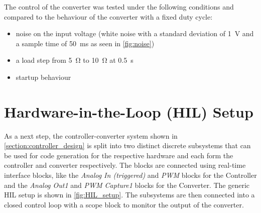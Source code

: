 The control of the converter was tested under the following conditions and compared to the behaviour of the converter with a fixed duty cycle:
\begin{itemize}
    \item noise on the input voltage (white noise with a standard deviation of \qty{1}{\volt} and a sample time of \qty{50}{\milli\second} as seen in \autoref{fig:noise})
    \item a load step from \qty{5}{\ohm} to \qty{10}{\ohm} at \qty{0.5}{\second}
    \item startup behaviour
\end{itemize}

\section{Hardware-in-the-Loop (HIL) Setup}
\label{section:hil_setup}

As a next step, the controller-converter system shown in \autoref{section:controller_design} is split into two distinct discrete subsystems that can be used for code generation for the respective hardware and each form the controller and converter respectively. The blocks are connected using real-time interface blocks, like the \textit{Analog In (triggered)} and \textit{PWM} blocks for the Controller and the \textit{Analog Out1} and \textit{PWM Capture1} blocks for the Converter. The generic HIL setup is shown in \autoref{fig:HIL_setup}. The subsystems are then connected into a closed control loop with a scope block to monitor the output of the converter.

